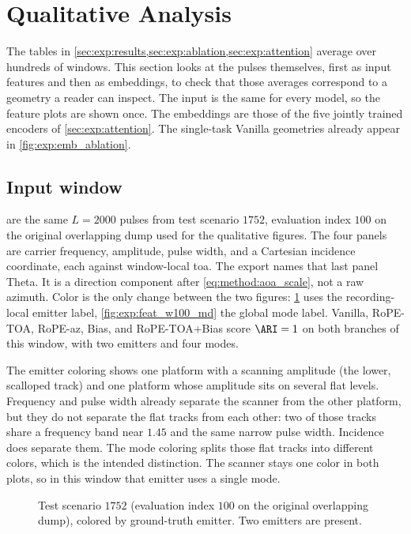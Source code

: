 \section{Qualitative Analysis}\label{sec:exp:qualitative}

The tables in \cref{sec:exp:results,sec:exp:ablation,sec:exp:attention} average over hundreds of windows.
This section looks at the pulses themselves, first as input features and then as embeddings, to check that those averages correspond to a geometry a reader can inspect.
The input is the same for every model, so the feature plots are shown once.
The embeddings are those of the five jointly trained encoders of \cref{sec:exp:attention}.
The single-task Vanilla geometries already appear in \cref{fig:exp:emb_ablation}.

\subsection*{Input window}\label{sec:exp:qualitative:features}

 are the same $L=2000$ pulses from test scenario $1752$, evaluation index $100$ on the original overlapping dump used for the qualitative figures.
The four panels are carrier frequency, amplitude, pulse width, and a Cartesian incidence coordinate, each against window-local \gls{toa}.
The export names that last panel Theta. It is a direction component after \cref{eq:method:aoa_scale}, not a raw azimuth.
Color is the only change between the two figures: \cref{fig:exp:feat_w100_em} uses the recording-local emitter label, \cref{fig:exp:feat_w100_md} the global mode label.
Vanilla, RoPE-TOA, RoPE-az, Bias, and RoPE-TOA+Bias score $\ARI=1$ on both branches of this window, with two emitters and four modes.

The emitter coloring shows one platform with a scanning amplitude (the lower, scalloped track) and one platform whose amplitude sits on several flat levels.
Frequency and pulse width already separate the scanner from the other platform, but they do not separate the flat tracks from each other: two of those tracks share a frequency band near $1.45$ and the same narrow pulse width.
Incidence does separate them.
The mode coloring splits those flat tracks into different colors, which is the intended distinction.
The scanner stays one color in both plots, so in this window that emitter uses a single mode.

\begin{figure}[tbp]
  \centering
  \caption{Test scenario $1752$ (evaluation index $100$ on the original overlapping dump), colored by ground-truth emitter. Two emitters are present.}
  \label{fig:exp:feat_w100_em}
\end{figure}

